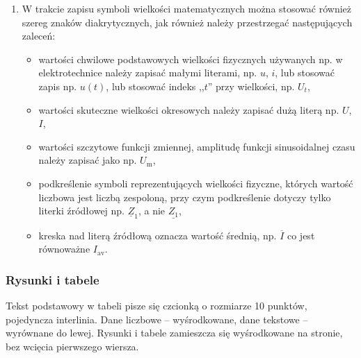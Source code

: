 \documentclass[12pt,twoside]{article}
\begin{document}
\begin{enumerate}[label=\arabic*), leftmargin=1.25cm]
\begin{itemize}[label={--},labelsep=0.4cm,leftmargin=0.6cm]
\item jednostek nie należy umieszczać w nawiasach kwadratowych, np. $I=1$ $\mathrm{[A]}$. Odstępstwem od tej zasady mogą być tabele, nagłówki kolumn, opisy osi na wykresach oraz w sporadycznych sytuacjach we wzorach matematycznych (ale tylko wówczas, gdy zależność matematyczna nie wskazuje w~jakiej jednostce wystąpi wartość liczbowa). Przykłady odstępstw zamieszczono w~podrozdziale \ref{Subsec:Rysunki-i-tabele}.   

\end{itemize}

\item W trakcie zapisu symboli wielkości matematycznych można stosować również szereg znaków diakrytycznych, jak również należy przestrzegać następujących zaleceń:

\begin{itemize}[label={--},labelsep=0.4cm,leftmargin=0.6cm]
\item wartości chwilowe podstawowych wielkości fizycznych używanych np. w elektrotechnice należy zapisać małymi literami, np. $u$, $i$, lub stosować zapis np. $u(t)$, lub stosować indeks ,,$t$'' przy wielkości, np. $U_t$,

\item wartości skuteczne wielkości okresowych należy zapisać dużą literą np. $U$, $I$, 

\item wartości szczytowe funkcji zmiennej, amplitudę funkcji sinusoidalnej czasu należy zapisać jako np. $U_\mathrm{m}$,

\item podkreślenie symboli reprezentujących wielkości fizyczne, których wartość liczbowa jest liczbą zespoloną, przy czym podkreślenie dotyczy tylko literki źródłowej np. $\underline{Z}_1$, a nie $\underline{Z_1}$,

\item kreska nad literą źródłową oznacza wartość średnią, np. $\overline{I}$ co jest równoważne $I_\mathrm{av}$.

\end{itemize}

\end{enumerate}




\subsubsection{Rysunki i tabele}
\label{Subsec:Rysunki-i-tabele}
Tekst podstawowy w tabeli pisze się czcionką o rozmiarze 10 punktów, pojedyncza interlinia. Dane liczbowe -- wyśrodkowane, dane tekstowe -- wyrównane do lewej. Rysunki i tabele zamieszcza się wyśrodkowane na stronie, bez wcięcia pierwszego wiersza.
\end{document}
